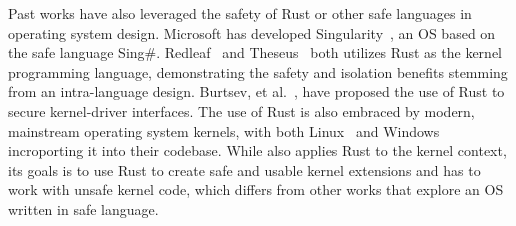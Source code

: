 Past works have also leveraged the safety of Rust or other safe languages in
    operating system design.
Microsoft has developed Singularity~\cite{singularity}, an OS based on the safe
    language Sing\#.
Redleaf~\cite{redleaf} and Theseus~\cite{theseus,theseus-kisv23} both utilizes
    Rust as the kernel programming language, demonstrating the safety and
    isolation benefits stemming from an intra-language design.
Burtsev, et al.~\cite{Burtsev-hotos23}, have proposed the use of Rust to secure
    kernel-driver interfaces.
The use of Rust is also embraced by modern, mainstream operating system
    kernels, with both Linux~\cite{rust-for-linux-doc} and
    Windows~\cite{rust-for-windows} incroporting it into their codebase.
While \projname{} also applies Rust to the kernel context, its goals is to use
    Rust to create safe and usable kernel extensions and has to work with
    unsafe kernel code, which differs from other works that explore an OS
    written in safe language.


